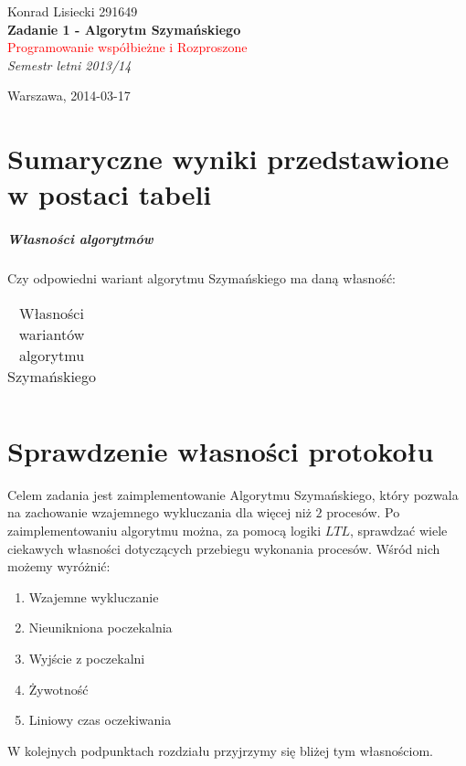 \documentclass[oneside]{book}
\newcommand*{\titleTH}{\begingroup %
\raggedleft %
\vspace*{\baselineskip} %

{\Large Konrad Lisiecki 291649}\\[0.167\textheight] %

{\LARGE\bfseries Zadanie 1 - Algorytm Szymańskiego}\\[\baselineskip] %

{\textcolor{Red}{\Huge Programowanie współbieżne i Rozproszone}}\\[\baselineskip] %

{\Large \textit{Semestr letni 2013/14  }}\par %

\vfill %

{\large  Warszawa, 2014-03-17}\par %
\renewcommand{\chaptername}{Podpunkt}

\vspace*{3\baselineskip} %
\endgroup}
\begin{document}
 

\pagestyle{empty} %
	

\titleTH %


\tableofcontents


\chapter{Sumaryczne wyniki przedstawione w postaci tabeli}
\paragraph{Własności algorytmów} Czy odpowiedni wariant algorytmu Szymańskiego ma daną własność:

\begin{table}[H]                                                                                                                                                             
  \begin{tabularx}{\textwidth}{| l | R | R | R | R | R | R | R |}                                                      
   \hline                                                                             \hline
   \end{tabularx}                                                                
  \caption{Własności wariantów algorytmu Szymańskiego}                 
 \end{table}        



\chapter{Sprawdzenie własności protokołu}


Celem zadania jest zaimplementowanie Algorytmu Szymańskiego, który pozwala na zachowanie wzajemnego wykluczania dla więcej niż $2$ procesów. Po zaimplementowaniu algorytmu można, za pomocą logiki $LTL$, sprawdzać wiele ciekawych własności dotyczących przebiegu wykonania procesów. Wśród nich możemy wyróżnić:
\begin{enumerate}
\item Wzajemne wykluczanie
\item Nieunikniona poczekalnia
\item Wyjście z poczekalni
\item Żywotność
\item Liniowy czas oczekiwania
\end{enumerate}
W kolejnych podpunktach rozdziału przyjrzymy się bliżej tym własnościom.
\end{document}
